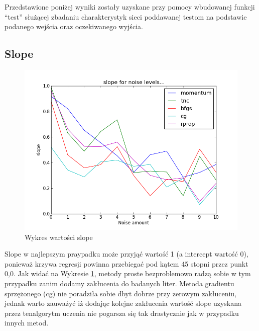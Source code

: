 \documentclass[a4paper]{article}
\begin{document}
Przedstawione poniżej wyniki zostały uzyskane przy pomocy wbudowanej funkcji “test” służącej zbadaniu charakterystyk sieci poddawanej testom na podstawie podanego wejścia oraz oczekiwanego wyjścia.

\subsection{Slope}
\begin{figure}[pht]
 \centering
 \includegraphics[scale=0.5]{../compare_plots/compare_plot_slope}
 \caption{Wykres wartości slope}\label{rys:plot1}
\end{figure}
Slope w najlepszym praypadku może przyjąć wartość 1 (a intercept wartość 0), ponieważ krzywa regresji 
powinna przebiegać pod kątem 45 stopni przez punkt 0,0. Jak widać na Wykresie \ref{rys:plot1},
metody proste bezproblemowo radzą sobie w tym przypadku zanim dodamy zakłucenia do badanych liter.
Metoda gradientu sprzężonego (cg) nie poradziła sobie dbyt dobrze przy zerowym zakłuceniu, jednak warto 
zauważyć iż dodając kolejne zakłucenia wartość slope uzyskana przez tenalgorytm uczenia nie pogarsza się tak drastycznie 
jak w przypadku innych metod.
\end{document}
